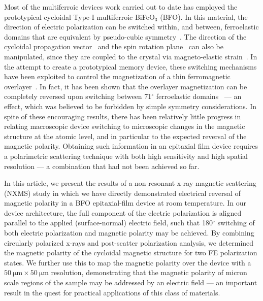 \documentclass[aps,prb,twocolumn,showpacs,superscriptaddress, longbibliography, 10pt]{revtex4-1}
\begin{document}
Most of the multiferroic devices work carried out to date has employed the prototypical cycloidal Type-I multiferroic BiFeO$_3$ (BFO).  In this material, the direction of electric polarization can be switched within, and between, ferroelastic domains that are equivalent by pseudo-cubic symmetry~\cite{zavaliche2006multiferroic}. The direction of the cycloidal propagation vector~\cite{lee2008single} and the spin rotation plane~\cite{zhao2006electrical, lebeugle2008electric, lee2008single} can also be manipulated, since they are coupled to the crystal via magneto-elastic strain~\cite{sando2013crafting}. In the attempt to create a prototypical memory device, these switching mechanisms have been exploited to control the magnetization of a thin ferromagnetic overlayer~\cite{chu2008electric, bea2008mechanisms, lebeugle2010exchange, heron2011electric, heron2014deterministic, sando2014bifeo3, gao2016electric}. In fact, it has been shown that the overlayer magnetization can be completely reversed upon switching between 71$^\circ$ ferroelastic domains~\cite{heron2011electric, heron2014deterministic} --- an effect, which was believed to be forbidden by simple symmetry considerations.  In spite of these encouraging results, there has been relatively little progress in relating macroscopic device switching to microscopic changes in the magnetic structure at the atomic level, and in particular to the expected reversal of the magnetic polarity.  Obtaining such information in an epitaxial film device requires a polarimetric scattering technique with both high sensitivity and high spatial resolution --- a combination that had not been achieved so far.

In this article, we present the results of a non-resonant x-ray magnetic scattering (NXMS) study in which we have directly demonstrated electrical reversal of magnetic polarity in a BFO epitaxial-film device at room temperature. In our device architecture, the full component of the electric polarization is aligned parallel to the applied (surface-normal) electric field, such that 180$^\circ$ switching of both electric polarization and magnetic polarity may be achieved. By combining circularly polarized x-rays and post-scatter polarization analysis, we determined the magnetic polarity of the cycloidal magnetic structure for two FE polarization states. We further use this to map the magnetic polarity over the device with a $\SI{50}{\micro\metre} \times \SI{50}{\micro\metre}$ resolution, demonstrating that the magnetic polarity of micron scale regions of the sample may be addressed by an electric field --- an important result in the quest for practical applications of this class of materials.
\end{document}
